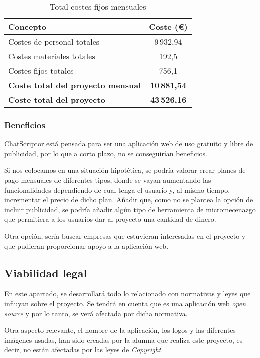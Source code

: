 \begin{table}[H]
\centering
\begin{tabular}{lc}
\toprule
Concepto & Coste (€) \\
\midrule
Costes de personal totales & 9\,932,94 \\
Costes materiales totales & 192,5  \\
Costes fijos totales & 756,1  \\
\midrule
\textbf{Coste total del proyecto mensual} & \textbf{10\,881,54} \\
\midrule
\textbf{Coste total del proyecto} & \textbf{43\,526,16} \\
\bottomrule
\end{tabular}
\caption{Total costes fijos mensuales}
\end{table}

\subsubsection{Beneficios}
ChatScriptor está pensada para ser una aplicación web de uso gratuito y libre de publicidad, por lo que a corto plazo, no se conseguirían beneficios.

Si nos colocamos en una situación hipotética, se podría valorar crear planes de pago mensuales de diferentes tipos, donde se vayan aumentando las funcionalidades dependiendo de cual tenga el usuario y, al mismo tiempo, incrementar el precio de dicho plan. Añadir que, como no se plantea la opción de incluir publicidad, se podría añadir algún tipo de herramienta de micromecenazgo que permitiera a los usuarios dar al proyecto una cantidad de dinero.

Otra opción, sería buscar empresas que estuvieran interesadas en el proyecto y que pudieran proporcionar apoyo a la aplicación web.

\subsection{Viabilidad legal}
En este apartado, se desarrollará todo lo relacionado con normativas y leyes que influyan sobre el proyecto. Se tendrá en cuenta que es una aplicación web \textit{open source} y por lo tanto, se verá afectada por dicha normativa.

Otra aspecto relevante, el nombre de la aplicación, los logos y las diferentes imágenes usadas, han sido creadas por la alumna que realiza este proyecto, es decir, no están afectadas por las leyes de \textit{Copyright}.

